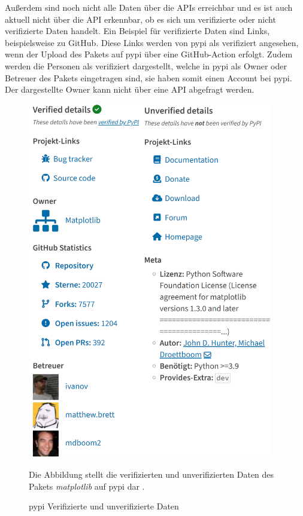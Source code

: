 Außerdem sind noch nicht alle Daten über die APIs erreichbar und es ist auch aktuell nicht über die API erkennbar, ob es sich um verifizierte oder nicht verifizierte Daten handelt.
Ein Beispiel für verifizierte Daten sind Links, beispielsweise zu GitHub.
Diese Links werden von \gls{pypi} als verifiziert angesehen, wenn der Upload des Pakets auf \gls{pypi} über eine GitHub-Action erfolgt.
Zudem werden die Personen als verifiziert dargestellt, welche in \gls{pypi} als Owner oder Betreuer des Pakets eingetragen sind, sie haben somit einen Account bei \gls{pypi}.
Der dargestellte Owner kann nicht über eine API abgefragt werden.

\begin{figure}
    \begin{center}
        \includegraphics[width=0.95\textwidth]{bilder/pypi.png}
    \end{center}
    \caption{\gls{pypi} Verifizierte und unverifizierte Daten}
    \label{fig:pypi_verified_unverified_details}
    \small
    Die Abbildung stellt die verifizierten und unverifizierten Daten des Pakets \emph{matplotlib} auf \gls{pypi} dar \autocite{python_software_foundation_pypi_2024}.
\end{figure}

